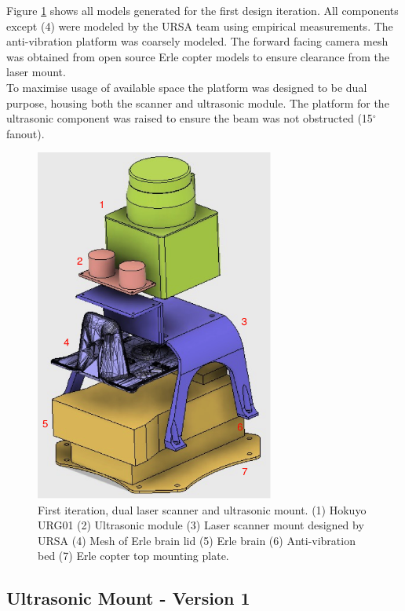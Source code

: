 \documentclass[capstone_report.tex]{subfiles}
\begin{document}
Figure \ref{fig:mount1} shows all models generated for the first design iteration.  All components except (4) were modeled by the URSA team using empirical measurements. The anti-vibration platform was coarsely modeled. The forward facing camera mesh was obtained from open source Erle copter models to ensure clearance from the laser mount.\\

To maximise usage of available space the platform was designed to be dual purpose, housing both the scanner and ultrasonic module.  The platform for the ultrasonic component was raised to ensure the beam was not obstructed (15$^\circ$ fanout).

\begin{figure}[H]
    \centering
    \includegraphics[width=0.7\textwidth]{imgs/mount1_labelled.png}
    \caption{First iteration, dual laser scanner and ultrasonic mount. (1) Hokuyo URG01 (2) Ultrasonic module (3) Laser scanner mount designed by URSA (4) Mesh of Erle brain lid (5) Erle brain (6) Anti-vibration bed (7) Erle copter top mounting plate.\label{fig:mount1}}
\end{figure}

\subsection{Ultrasonic Mount - Version 1}
\end{document}
